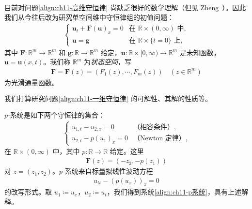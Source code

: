 \documentclass[../../main.tex]{subfiles}
\begin{document}
目前对问题\eqref{align:ch11-高维守恒律} 尚缺乏很好的数学理解（但见 Zheng~\cite{Zh}）。因此我们从今往后改为研究单空间维中守恒律组的初值问题：
\begin{align}
\begin{cases}
\mathbf{u}_t+\mathbf{F}(\mathbf{u})_x=0 & \text{在 } \mathbb{R}\times(0,\infty) \text{ 中},\\
\mathbf{u}=\mathbf{g} & \text{在 } \mathbb{R}\times\{t=0\} \text{ 上},
\end{cases}
\label{align:ch11-一维守恒律}
\end{align}
其中 $\mathbf{F}:\mathbb{R}^m\to\mathbb{R}^m$ 和 $\mathbf{g}:\mathbb{R}\to\mathbb{R}^m$ 给定，$\mathbf{u}:\mathbb{R}\times[0,\infty)\to\mathbb{R}^m$ 是未知函数，$\mathbf{u}=\mathbf{u}(x,t)$。我们称 $\mathbb{R}^m$ 为\emph{状态空间}，写
\begin{align*}
\mathbf{F}=\mathbf{F}(z)=(F_1(z),\cdots,F_m(z)) \quad (z\in\mathbb{R}^m)
\end{align*}
为光滑通量函数。

我们打算研究问题\eqref{align:ch11-一维守恒律} 的可解性、其解的性质等。

\begin{example}\label{example:ch11-p系统}
$p$-系统是如下两个守恒律的集合：
\begin{align}
\begin{cases}
u_{1,t}-u_{2,x}=0 & \text{（相容条件）},\\
u_{2,t}-p(u_1)_x=0 & \text{（Newton 定律）},
\end{cases}
\label{align:ch11-p系统}
\end{align}
在 $\mathbb{R}\times(0,\infty)$ 中，其中 $p:\mathbb{R}\to\mathbb{R}$ 给定。这里
\begin{align}
\mathbf{F}(z)=(-z_2,-p(z_1))
\label{align:ch11-p系统通量}
\end{align}
对 $z=(z_1,z_2)$。$p$-系统来自标量拟线性波动方程
\begin{align}
u_{tt}-(p(u_x))_x=0
\label{align:ch11-拟线性波动}
\end{align}
的改写形式。取 $u_1\coloneqq u_x$，$u_2\coloneqq u_t$，我们得到系统\eqref{align:ch11-p系统}，具有上述解释。
\end{example}
\end{document}
